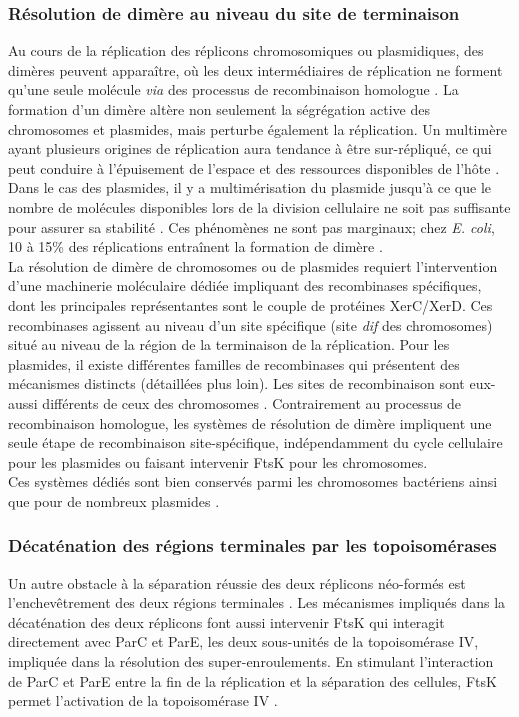 \subsubsection{Résolution de dimère au niveau du site de terminaison}\label{dimere}
	Au cours de la réplication des réplicons chromosomiques ou plasmidiques, des dimères peuvent apparaître, où les deux intermédiaires de réplication ne forment qu'une seule molécule \textit{via} des processus de recombinaison homologue \citep{Johnson2005a}. La formation d'un dimère altère non seulement la ségrégation active des chromosomes et plasmides, mais perturbe également la réplication. Un multimère ayant plusieurs origines de réplication aura tendance à être sur-répliqué, ce qui peut conduire à l'épuisement de l'espace et des ressources disponibles de l'hôte  \citep{hallet2004dna}. Dans le cas des plasmides, il y a multimérisation du plasmide jusqu'à ce que le nombre de molécules disponibles lors de la division cellulaire ne soit pas suffisante pour assurer sa stabilité \citep{summers1984multimerization}. Ces phénomènes ne sont pas marginaux; chez \textit{E. coli}, 10 à 15\% des réplications entraînent la formation de dimère \citep{perals2000functional}.\\
	La résolution de dimère de chromosomes ou de plasmides requiert l'intervention d'une machinerie moléculaire dédiée impliquant des recombinases spécifiques, dont les principales représentantes sont le couple de protéines XerC/XerD. Ces recombinases agissent au niveau d'un site spécifique (site \textit{dif} des chromosomes) situé au niveau de la région de la terminaison de la réplication. Pour les plasmides, il existe différentes familles de recombinases qui présentent des mécanismes distincts (détaillées plus loin). Les sites de recombinaison sont eux-aussi différents de ceux des chromosomes \citep{hallet2004dna}. Contrairement au processus de recombinaison homologue, les systèmes de résolution de dimère impliquent une seule étape de recombinaison site-spécifique, indépendamment du cycle cellulaire pour les plasmides \citep{hallet2004dna} ou faisant intervenir FtsK pour les chromosomes. \\
	Ces systèmes dédiés sont bien conservés parmi les chromosomes bactériens ainsi que pour de nombreux plasmides \citep{thomas2004}.

 
 \subsubsection{Décaténation des régions terminales par les topoisomérases}
	Un autre obstacle à la séparation réussie des deux réplicons néo-formés est l'enchevêtrement des deux régions terminales \citep{thanbichler2010}. Les mécanismes impliqués dans la décaténation des deux réplicons font aussi intervenir FtsK qui interagit directement avec ParC et ParE, les deux sous-unités de la topoisomérase IV, impliquée dans la résolution des super-enroulements. En stimulant l'interaction de ParC et ParE entre la fin de la réplication et la séparation des cellules, FtsK permet l'activation de la topoisomérase IV \citep{thanbichler2010}. 



